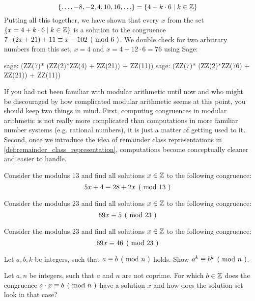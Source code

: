 \begin{example}
$$
\{\ldots, -8,-2, 4,10, 16,\ldots\} = \{4+k\cdot 6 \;|\; k\in \mathbb{Z}\}
$$
Putting all this together, we have shown that every $x$ from the set $\{x=4+k\cdot 6 \;|\; k\in \mathbb{Z}\}$ is a solution to the congruence $\kongru{7\cdot(2x+21) + 11}{x-102}{6}$. We double check for two arbitrary numbers from this set, $x=4$ and $x=4 + 12\cdot 6 = 76$ using  Sage:
\begin{sagecommandline}
sage: (ZZ(7)* (ZZ(2)*ZZ(4) + ZZ(21)) + ZZ(11))  %
sage: (ZZ(7)* (ZZ(2)*ZZ(76) + ZZ(21)) + ZZ(11))  %
\end{sagecommandline}
\end{example}
If you had not been familiar with modular arithmetic until now and who might be discouraged by how complicated modular arithmetic seems at this point, you should keep two things in mind. First, computing congruences in modular arithmetic is not really more complicated than computations in more familiar number systems (e.g. rational numbers), it is just a matter of getting used to it. Second, once we introduce the idea of remainder class representations in \ref{def:remainder_class_representation}, computations become conceptually cleaner and easier to handle.
\begin{exercise}
\label{exercise_congruence_in_F13}
Consider the modulus $13$ and find all solutions $x\in \mathbb{Z}$ to the following congruence: $$\kongru{5x+4}{28+2x}{13}$$
\end{exercise}
\begin{exercise}Consider the modulus $23$ and find all solutions $x\in \mathbb{Z}$ to the following congruence: $$\kongru{69x}{5}{23}$$
\end{exercise}
\begin{exercise}Consider the modulus $23$ and find all solutions $x\in \mathbb{Z}$ to the following congruence: $$\kongru{69x}{46}{23}$$
\end{exercise}
\begin{exercise}
Let $a,b,k$ be integers, such that $\kongru{a}{b}{n}$ holds. Show $\kongru{a^k}{b^k}{n}$.
\end{exercise}
\begin{exercise}
Let $a,n$ be integers, such that $a$ and $n$ are not coprime. For which $b\in\mathbb{Z}$ does the congruence $\kongru{a\cdot x}{b}{n}$ have a solution $x$ and how does the solution set look in that case?
\end{exercise}

